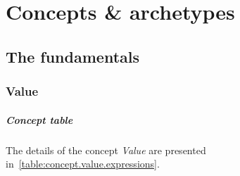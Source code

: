 \chapter{Concepts \& archetypes}
\label{appendix:concepts.and.archetypes}

\section{The fundamentals}

\subsection{Value}

\paragraph{Concept table}

The details of the concept \emph{Value} are presented in~\cref{table:concept.value.expressions}.

